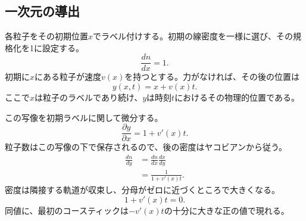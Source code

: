 \subsection{一次元の導出}

各粒子をその初期位置\(x\)でラベル付けする。初期の線密度を一様に選び、その規格化を1に設定する。
\begin{equation}
\frac{dn}{dx}=1.
\label{eq:c09-initial-density}
\end{equation}
初期に\(x\)にある粒子が速度\(v(x)\)を持つとする。力がなければ、その後の位置は
\begin{equation}
y(x,t)=x+v(x)t.
\label{eq:c09-ballistic-map}
\end{equation}
ここで\(x\)は粒子のラベルであり続け、\(y\)は時刻\(t\)におけるその物理的位置である。

この写像を初期ラベルに関して微分する。
\begin{equation}
\frac{\partial y}{\partial x}
=1+v'(x)t.
\label{eq:c09-jacobian}
\end{equation}
粒子数はこの写像の下で保存されるので、後の密度はヤコビアンから従う。
\begin{align}
\frac{dn}{dy}
&=
\frac{dn}{dx}\frac{dx}{dy}\\
&=
\frac{1}{1+v'(x)t}.
\label{eq:c09-caustic-density}
\end{align}
密度は隣接する軌道が収束し、分母がゼロに近づくところで大きくなる。
\begin{equation}
1+v'(x)t=0.
\label{eq:c09-caustic-condition}
\end{equation}
同値に、最初のコースティックは\(-v'(x)t\)の十分に大きな正の値で現れる。

